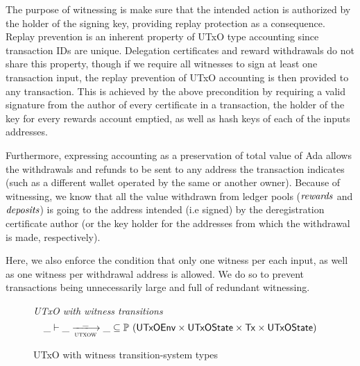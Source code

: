 \documentclass[11pt,a4paper,dvipsnames]{article}
\newcommand{\Tx}{\type{Tx}}
\newcommand{\UTxOState}{\ensuremath{\type{UTxOState}}}
\newcommand{\UTxOEnv}{\type{UTxOEnv}}
\theoremstyle{definition}
\theoremstyle{definition}
\begin{document}
The purpose of witnessing is make sure that the intended action is authorized by
the holder of the signing key, providing replay protection as a consequence.
Replay prevention is an inherent property of UTxO type accounting
since transaction IDs are unique.
Delegation certificates and reward withdrawals do not share this property,
though if we require all witnesses to sign at least one transaction input,
the replay prevention of UTxO accounting is then provided to any transaction.
This is achieved by the above precondition by requiring a valid signature
from the author of every certificate in a transaction, the
holder of the key for every rewards account emptied, as well as
hash keys of each of the inputs addresses.

Furthermore, expressing
accounting as a preservation of total value of Ada allows the withdrawals
and refunds to be sent to any address the transaction indicates
(such as a different wallet operated by the same or another owner).
Because of witnessing, we know that all the value withdrawn from ledger
pools ($\mathit{rewards}$ and $\mathit{deposits}$) is going to the address intended
(i.e signed) by the deregistration certificate author
(or the key holder for the addresses from which the withdrawal is made,
respectively).

Here, we also enforce the condition that only one witness per each input,
as well as one
witness per withdrawal address is allowed. We do so to prevent transactions
being unnecessarily large and full of redundant witnessing.

\begin{figure}
  \emph{UTxO with witness transitions}
  \begin{equation*}
    \var{\_} \vdash
    \var{\_} \trans{utxow}{\_} \var{\_}
    \subseteq \powerset (\UTxOEnv \times \UTxOState \times \Tx \times \UTxOState)
  \end{equation*}
  \caption{UTxO with witness transition-system types}
  \label{fig:ts-types:utxow}
\end{figure}
\end{document}
